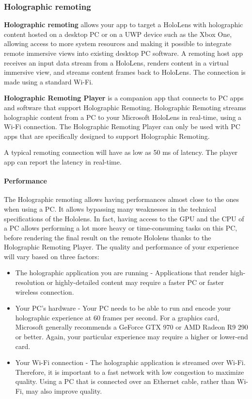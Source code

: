 \subsubsection{ Holographic remoting }

\textbf {Holographic remoting } allows your app to target a HoloLens with holographic content hosted on a desktop PC or on a UWP device such as the Xbox One, allowing access to more system resources and making it possible to integrate remote immersive views into existing desktop PC software. A remoting host app receives an input data stream from a HoloLens, renders content in a virtual immersive view, and streams content frames back to HoloLens. The connection is made using a standard Wi-Fi. 

\textbf {Holographic Remoting Player} is a companion app that connects to PC apps and software that support Holographic Remoting. Holographic Remoting streams holographic content from a PC to your Microsoft HoloLens in real-time, using a Wi-Fi connection. The Holographic Remoting Player can only be used with PC apps that are specifically designed to support Holographic Remoting.

A typical remoting connection will have as low as 50 ms of latency. The player app can report the latency in real-time.

\paragraph{Performance}

The Holographic remoting allows having performances almost close to the ones when using a PC. It allows bypassing many weaknesses in the technical specifications of the Hololens. In fact, having access to the GPU and the CPU of a PC allows performing a lot more heavy or time-consuming tasks on this PC, before rendering the final result on the remote Hololens thanks to the Holographic Remoting Player.
The quality and performance of your experience will vary based on three factors:
\begin{itemize}

\item  The holographic application you are running - Applications that render high-resolution or highly-detailed content may require a faster PC or faster wireless connection.

\item Your PC's hardware - Your PC needs to be able to run and encode your holographic experience at 60 frames per second. For a graphics card, Microsoft generally recommends a GeForce GTX 970 or AMD Radeon R9 290 or better. Again, your particular experience may require a higher or lower-end card.

\item Your Wi-Fi connection - The holographic application is streamed over Wi-Fi. Therefore, it is important to a fast network with low congestion to maximize quality. Using a PC that is connected over an Ethernet cable, rather than Wi-Fi, may also improve quality.

\end{itemize}



